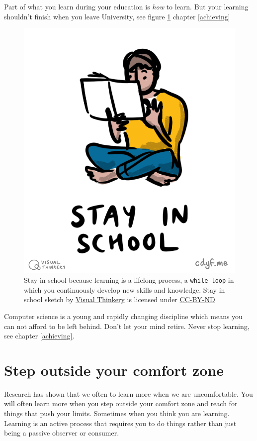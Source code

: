 \documentclass[
]{book}
\begin{document}
Part of what you learn during your education is \emph{how} to learn. But your learning shouldn't finish when you leave University, see figure \ref{fig:stayinschool-fig} chapter \ref{achieving}

\begin{figure}

{\centering \includegraphics[width=0.5\linewidth]{images/Stay in school} 

}

\caption{Stay in school because learning is a lifelong process, a \texttt{while\ loop} in which you continuously develop new skills and knowledge. Stay in school sketch by \href{https://visualthinkery.com}{Visual Thinkery} is licensed under \href{https://creativecommons.org/licenses/by-nd/4.0/}{CC-BY-ND}}\label{fig:stayinschool-fig}
\end{figure}



Computer science is a young and rapidly changing discipline which means you can not afford to be left behind. Don't let your mind retire. \citep{thewire} Never stop learning, see chapter \ref{achieving}.

\hypertarget{comfy}{%
\section{Step outside your comfort zone}\label{comfy}}

Research has shown that we often to learn more when we are uncomfortable. You will often learn more when you step outside your comfort zone and reach for things that push your limits. Sometimes when you think you are learning. Learning is an active process that requires you to do things rather than just being a passive observer or consumer. \citep{sigman23, sigman23-extra}
\end{document}
